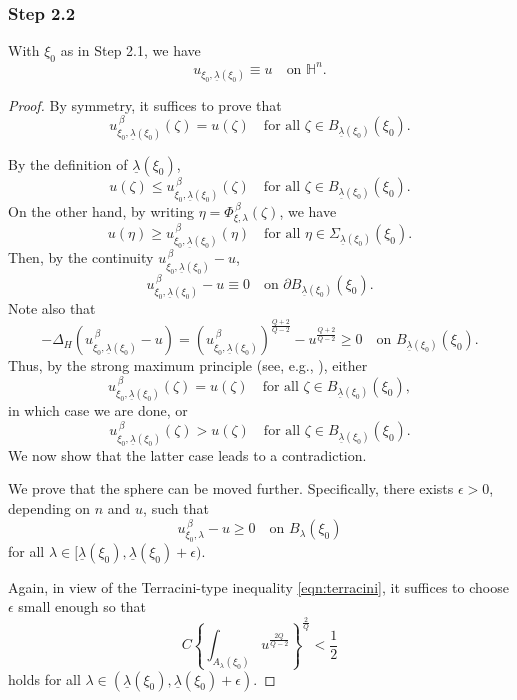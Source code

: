 \documentclass[reqno]{amsart}
\theoremstyle{definition}
\theoremstyle{remark}
\numberwithin{equation}{section}
\begin{document}
\subsubsection*{Step 2.2}
With $\xi_0$ as in Step 2.1, we have
\[
u_{\xi_0,\underline{\lambda}(\xi_0)} \equiv u \quad \text{on } \mathbb{H}^{n}.
\]

\begin{proof}
By symmetry, it suffices to prove that
\[
u_{\xi_0,\underline{\lambda}(\xi_0)}^{\,\beta}(\zeta) = u(\zeta) \quad \text{for all } \zeta \in B_{\underline{\lambda}(\xi_0)}(\xi_0).
\]

By the definition of $\underline{\lambda}(\xi_0)$, 
\[
u(\zeta) \leq u_{\xi_0,\underline{\lambda}(\xi_0)}^{\,\beta} (\zeta)  \quad \text{for all } \zeta\in  B_{\underline{\lambda}(\xi_0)}(\xi_0).
\]
On the other hand, by writing $\eta=\Phi_{\xi,\lambda}^{\, \beta}(\zeta)$, we have
\[
u(\eta) \geq u_{\xi_0,\underline{\lambda}(\xi_0)}^{\,\beta} (\eta) \quad \text{for all } \eta \in \Sigma_{\underline{\lambda}(\xi_0)}(\xi_0).
\]
Then, by the continuity $u_{\xi_0,\underline{\lambda}(\xi_0)}^{\,\beta}-u$,
\[
u_{\xi_0,\underline{\lambda}(\xi_0)}^{\,\beta} - u \equiv 0 \quad \text{on } \partial B_{\underline{\lambda}(\xi_0)}(\xi_0).
\]
Note also that
\[
-\Delta_{\! H} \left(u_{\xi_0,\underline{\lambda}(\xi_0)}^{\,\beta} - u\right) = \left(u_{\xi_0,\underline{\lambda}(\xi_0)}^{\,\beta}\right)^{\frac {Q+2}{Q-2}} - u^{\frac {Q+2}{Q-2}} \geq 0 \quad \text{on } B_{\underline{\lambda}(\xi_0)}(\xi_0).
\]
Thus, by the strong maximum principle (see, e.g., \cite{Bony69}), either
\[
u_{\xi_0,\underline{\lambda}(\xi_0)}^{\,\beta}(\zeta) = u(\zeta) \quad \text{for all } \zeta \in B_{\underline{\lambda}(\xi_0)}(\xi_0),
\]
in which case we are done, or
\[
u_{\xi_0,\underline{\lambda}(\xi_0)}^{\,\beta}(\zeta) > u(\zeta) \quad \text{for all } \zeta \in B_{\underline{\lambda}(\xi_0)}(\xi_0).
\]
We now show that the latter case leads to a contradiction.

We prove that the sphere can be moved further. Specifically, there exists $\epsilon > 0$, depending on $n$ and $u$, such that
\[
u_{\xi_0,\lambda}^{\,\beta} - u \geq 0 \quad \text{on } B_{\lambda}(\xi_0)
\]
for all $\lambda \in [\underline{\lambda}(\xi_0), \underline{\lambda}(\xi_0) + \epsilon)$.

Again, in view of the Terracini-type inequality \eqref{eqn:terracini}, it suffices to choose $\epsilon$ small enough so that
\begin{equation}\label{eqn:lessthanhalf2}
C \left\{ \int_{A_{\lambda}(\xi_0)} u^{\frac{2Q}{Q-2}} \right\}^{\frac{2}{Q}} < \frac{1}{2}
\end{equation}
holds for all $\lambda \in (\underline{\lambda}(\xi_0), \underline{\lambda}(\xi_0) + \epsilon)$.


\end{proof}
\end{document}
